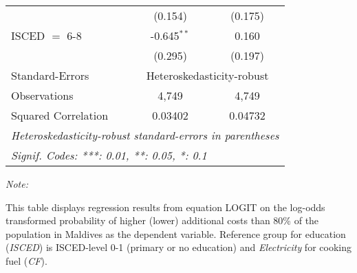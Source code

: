 \begin{table}[htbp!]
\begin{adjustbox}{width = 1\textwidth, max height = 0.95\textheight, center}
\begin{threeparttable}[b]
\begin{tabular}{lcc}
                                 & (0.154)        & (0.175)\\   
            ISCED $=$ 6-8        & -0.645$^{**}$  & 0.160\\   
                                 & (0.295)        & (0.197)\\   
            \midrule 
            Standard-Errors & \multicolumn{2}{c}{Heteroskedasticity-robust} \\ 
            Observations         & 4,749          & 4,749\\  
            Squared Correlation  & 0.03402        & 0.04732\\  
            \midrule \midrule
            \multicolumn{3}{l}{\emph{Heteroskedasticity-robust standard-errors in parentheses}}\\
            \multicolumn{3}{l}{\emph{Signif. Codes: ***: 0.01, **: 0.05, *: 0.1}}\\
         \end{tabular}
         
         \begin{tablenotes}\item \medskip \textit{Note:}
            \item This table displays regression results from equation LOGIT on the log-odds transformed probability of higher (lower) additional costs than 80\% of the population in Maldives as the dependent variable. Reference group for education (\textit{ISCED}) is ISCED-level 0-1 (primary or no education) and \textit{Electricity} for cooking fuel (\textit{CF}).
         \end{tablenotes}
      \end{threeparttable}
   \end{adjustbox}
\end{table}


